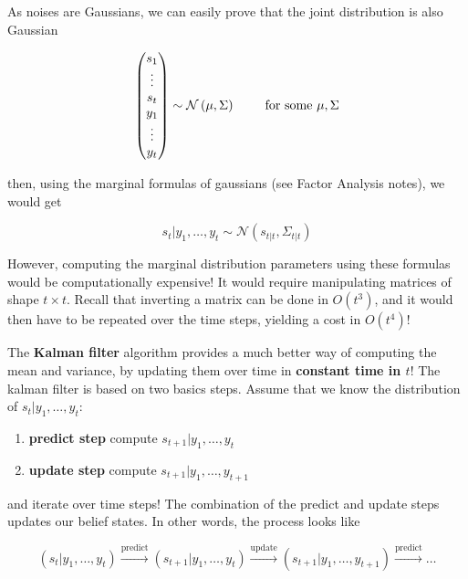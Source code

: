 \documentclass{article}
\begin{document}
As noises are Gaussians, we can easily prove that the joint distribution is also Gaussian

\[ \begin{pmatrix}
s_1\\\vdots\\s_t\\y_1 \\\vdots \\ y_t
\end{pmatrix} \sim \mathcal{N} \left(\mu, \Sigma\right) \ \ \ \ \ \ \text{ for some $ \mu, \Sigma $} \]

then, using the marginal formulas of gaussians (see Factor Analysis notes), we would get 

\[ s_t | y_1, \dots, y_t \sim \mathcal{N} \left( s_{t|t} , \Sigma_{t|t}\right) \]

However, computing the marginal distribution parameters using these formulas would be computationally expensive! It would require manipulating matrices of shape $ t \times t $. Recall that inverting a matrix can be done in $ O(t^3) $, and it would then have to be repeated over the time steps, yielding a cost in $ O(t^4) $!

The \textbf{Kalman filter} algorithm provides a much better way of computing the mean and variance, by updating them over time in \textbf{constant time in $ t $}! The kalman filter is based on two basics steps. Assume that we know the distribution of $ s_t | y_1, \dots, y_t $:

\begin{enumerate}
	\item[]\textbf{predict step} compute $ s_{t+1} | y_1, \dots, y_t $
	\item[]\textbf{update step} compute $ s_{t+1} | y_1, \dots, y_{t+1} $
\end{enumerate}

and iterate over time steps! The combination of the predict and update steps updates our belief states. In other words, the process looks like

\[ (s_t | y_1, \dots, y_t) \xrightarrow[]{\text{predict}} (s_{t+1} | y_1, \dots, y_t) \xrightarrow[]{\text{update}} (s_{t+1} | y_1, \dots, y_{t+1}) \xrightarrow[]{\text{predict}} \dots \]
\end{document}
